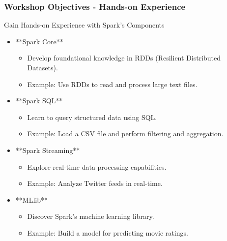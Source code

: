 \documentclass[aspectratio=169]{beamer}
\begin{document}
\begin{frame}[fragile]
    \frametitle{Workshop Objectives - Hands-on Experience}
    \begin{block}{Gain Hands-on Experience with Spark's Components}
        \begin{itemize}
            \item **Spark Core**
                \begin{itemize}
                    \item Develop foundational knowledge in RDDs (Resilient Distributed Datasets).
                    \item Example: Use RDDs to read and process large text files.
                \end{itemize}
            \item **Spark SQL**
                \begin{itemize}
                    \item Learn to query structured data using SQL.
                    \item Example: Load a CSV file and perform filtering and aggregation.
                \end{itemize}
            \item **Spark Streaming**
                \begin{itemize}
                    \item Explore real-time data processing capabilities.
                    \item Example: Analyze Twitter feeds in real-time.
                \end{itemize}
            \item **MLlib**
                \begin{itemize}
                    \item Discover Spark's machine learning library.
                    \item Example: Build a model for predicting movie ratings.
                \end{itemize}
        \end{itemize}
    \end{block}
\end{frame}
\end{document}
